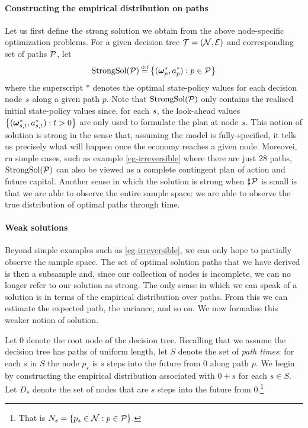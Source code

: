 \documentclass[12pt,a4paper,twoside, draft]{article}
\begin{document}
\paragraph{Constructing the empirical distribution on paths}
Let us first define the strong solution we obtain from the above node-specific
optimization problems.
For a given decision tree $\mathcal T = (\mathcal N, \mathcal E)$ and corresponding set of
paths $\mathcal P$, let
\[
   \textup{StrongSol}(\mc P) \defeq \left\{
      (\boldsymbol{\omega}^{*}_{p}, a^{*}_{p}) : p \in \mc P
   \right\}
\]
where the superscript $*$ denotes the optimal state-policy values
for each decision node ${s}$ along a given path $p$.
Note that $\textup{StrongSol}(\mathcal P)$ only contains the realised initial
state-policy values since, for each ${s}$, the look-ahead values
$\left\{(\boldsymbol{\omega}^{*}_{{s}, t}, a^{*}_{{s}, t}) : t > 0 \right\}$ are only used to
formulate the plan at node ${s}$.
This notion of solution is strong in the sense that, assuming the model is
fully-specified, it tells us precisely what will happen once the economy
reaches a given node.
Moreovei, rn simple cases, such as example \ref{eg-irreversible} where there
are just $28$ paths, $\textup{StrongSol}(\mathcal P)$ can also be viewed as a
complete contingent plan of action and future capital.
Another sense in which the solution is strong when $\mathbin{\sharp}\hskip1pt \mathcal P$
is small is that we are able to observe the entire sample space: we are able to
observe the true distribution of optimal paths through time.

\paragraph{Weak solutions}
Beyond simple examples such as \cref{eg-irreversible}, we can only hope to
partially observe the sample space.
The set of optimal solution paths that we have derived is then a subsample and,
since our collection of nodes is incomplete, we can no longer refer to our
solution as strong.
The only sense in which we can speak of a solution is in terms of the empirical
distribution over paths. 
From this we can estimate the expected path, the variance, and so on.
We now formalise this weaker notion of solution.

Let $\mathfrak{0}$ denote the root node of the decision tree.
Recalling that we assume the decision tree has paths of uniform length, let $S$
denote the set of \emph{path times}: for each $s$ in $S$ the node $p_s$ is $s$
steps into the future from $\mathfrak{0}$ along path $p$.
We begin by constructing the empirical distribution associated with
$\mathfrak{0} + s$ for each $s \in S$.
Let $D_s$ denote the set of nodes that are $s$ steps into the future from
$\mathfrak{0}$.\footnote{
   That is $N_{s} = \left\{ p_{s} \in \mathcal N : p \in \mathcal P\right\}$.
}
\end{document}
